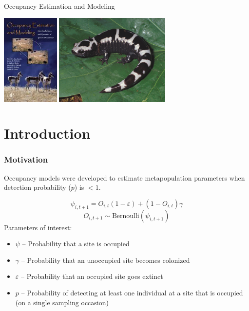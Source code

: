 \documentclass[color=usenames,dvipsnames]{beamer}\usepackage[]{graphicx}\usepackage[]{xcolor}
\begin{document}
\begin{frame}[plain]
  \begin{center}
    {\huge Occupancy Estimation and Modeling \par}
    \vfill
    \includegraphics[height=4.6cm,keepaspectratio]{figs/book} %
    \hspace{0.5cm}
      \includegraphics[height=4.6cm,keepaspectratio,trim = 0mm
        0mm 0mm 0mm, clip]{figs/marbled_salamander.jpg}
  \end{center}
\end{frame}



\section{Introduction}


\begin{frame}
  \frametitle{Motivation}
  {\centering \large Occupancy models were developed to estimate metapopulation
    parameters when {detection probability} ($p$) is $<1$. \par}
  \pause
  \[
    \psi_{i,t+1} = O_{i,t}(1-\varepsilon) + (1-O_{i,t})\gamma
  \]
  \[
    O_{i,t+1} \sim \mbox{Bernoulli}(\psi_{i,t+1})
  \]
  \pause
  \vfill
  Parameters of interest:
  \begin{itemize}[<+->]
    \item $\psi$ -- Probability that a site is occupied
    \item $\gamma$ -- Probability that an unoccupied site becomes colonized
    \item $\varepsilon$ -- Probability that an occupied site goes extinct
    \item $p$ -- Probability of detecting at least one individual at a
      site that is occupied (on a single sampling occasion)
  \end{itemize}
\end{frame}
\end{document}
